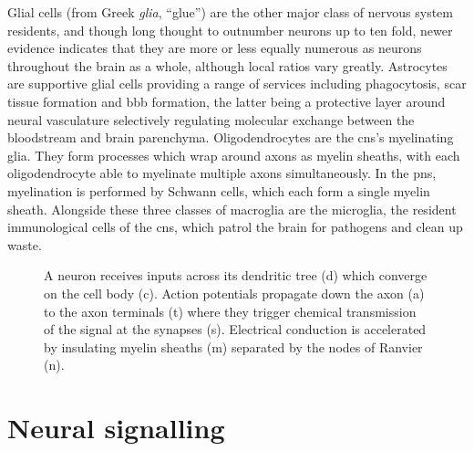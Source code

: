 Glial cells (from Greek \textit{glia}, ``glue'') are the other major class of nervous system residents, and though long thought to outnumber neurons up to ten fold, newer evidence indicates that they are more or less equally numerous as neurons throughout the brain as a whole, although local ratios vary greatly\autocite{Herculano-Houzel2014}.
Astrocytes are supportive glial cells providing a range of services including phagocytosis, scar tissue formation and \gls{bbb} formation, the latter being a protective layer around neural vasculature selectively regulating molecular exchange between the bloodstream and brain parenchyma.
Oligodendrocytes are the \gls{cns}'s myelinating glia.
They form processes which wrap around axons as myelin sheaths, with each oligodendrocyte able to myelinate multiple axons simultaneously.
In the \gls{pns}, myelination is performed by Schwann cells, which each form a single myelin sheath.
Alongside these three classes of macroglia are the microglia, the resident immunological cells of the \gls{cns}, which patrol the brain for pathogens and clean up waste.

\begin{figure}[hbt!]
  \centering
  
  \caption[Structure of a neuron]{A neuron receives inputs across its dendritic tree (d) which converge on the cell body (c). Action potentials propagate down the axon (a) to the axon terminals (t) where they trigger chemical transmission of the signal at the synapses (s). Electrical conduction is accelerated by insulating myelin sheaths (m) separated by the nodes of Ranvier (n).}
  \label{fig:neuron}
\end{figure}

\section{Neural signalling}

